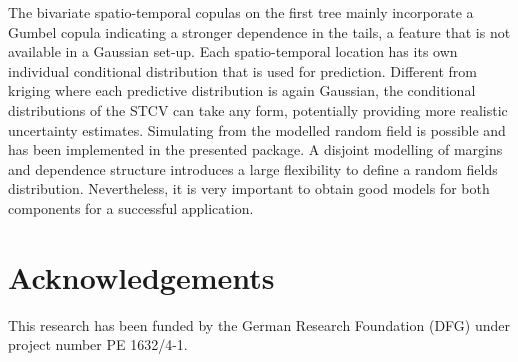 \documentclass[article,nojss]{jss}
\begin{document}
The bivariate spatio-temporal copulas on the first tree mainly incorporate a Gumbel copula indicating a stronger dependence in the tails, a feature that is not available in a Gaussian set-up. Each spatio-temporal location has its own individual conditional distribution that is used for prediction. Different from kriging where each predictive distribution is again Gaussian, the conditional distributions of the STCV can take any form, potentially providing more realistic uncertainty estimates. Simulating from the modelled random field is possible and has been implemented in the presented package. A disjoint modelling of margins and dependence structure introduces a large flexibility to define a random fields distribution. Nevertheless, it is very important to obtain good models for both components for a successful application.

\clearpage
\section*{Acknowledgements}
This research has been funded by the German Research Foundation (DFG) under project number PE 1632/4-1.


\end{document}
